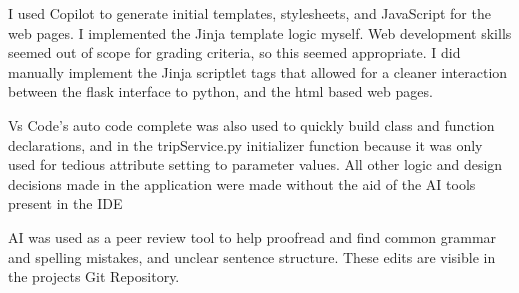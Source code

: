 ﻿\documentclass[11pt]{article}
\begin{document}
I used Copilot to generate initial templates, stylesheets, and JavaScript for the web pages. I implemented the Jinja template logic myself. 
Web development skills seemed out of scope for grading criteria, 
so this seemed appropriate. I did manually implement the Jinja scriptlet tags that allowed for a cleaner 
interaction between the flask interface to python, and the html based web pages. 

Vs Code's auto code complete was also used to quickly build class and function declarations, and in the tripService.py 
initializer function because it was only used for tedious attribute setting to parameter values.   
All other logic and design decisions made in the application were made without the aid of the AI tools present in the IDE

AI was used as a peer review tool to help proofread and find common grammar and spelling mistakes, and unclear sentence structure. These edits are visible in the projects Git Repository.
\end{document}
